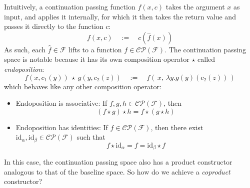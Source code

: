 \documentclass[twoside]{article}
\newcommand{\qdefeq}{\ensuremath{\quad :=\quad}}
\newcommand{\id}{\mbox{id}}
\begin{document}
\begin{minipage}{12cm}
Intuitively, a continuation passing function $ f(x, c) $ takes the argument $ x $ as input, and applies
it internally, for which it then takes the return value and passes it directly to the function $ c $:
$$ f(x, c) \qdefeq c(\hat{f}(x)) $$
As such, each $ \hat{f}\in\mathcal{F} $ lifts to a function $ f\in\mathcal{CP(F)} $. The continuation
passing space is notable because it has its own composition operator $ \star $ called \emph{endoposition}:
$$ f(x, c_1(y))\ \star\ g(y, c_2(z)) \qdefeq f(\,x,\ \lambda y.g(y)(c_2(z))\,) $$
which behaves like any other composition operator:
\begin{itemize}
\item Endoposition is associative: If $ f,g,h\in\mathcal{CP(F)} $, then
	$$ (f \star g) \star h = f \star (g \star h) $$
\item Endoposition has identities: If $ f\in\mathcal{CP(F)} $, then there exist
	$ \id_\alpha,\id_\beta\in\mathcal{CP(F)} $ such that
	$$ f \star \id_\alpha = f = \id_\beta \star f $$
\end{itemize}


\end{minipage}\newpage\begin{minipage}{12cm}


In this case, the continuation passing space also has a product constructor analogous
to that of the baseline space. So how do we achieve a \emph{coproduct} constructor?


\end{minipage}
\end{document}
